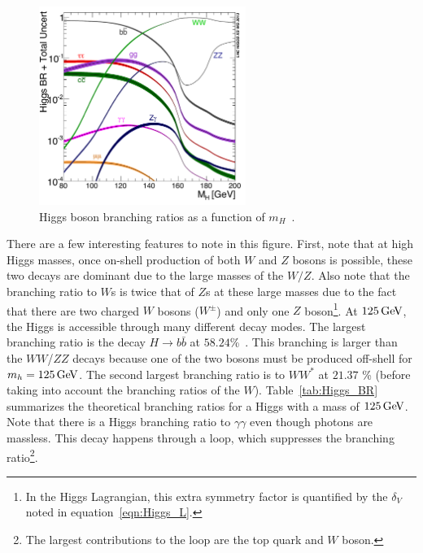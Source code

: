 \begin{figure}[h!]
  \centering
  \captionsetup{justification=centering}
  \includegraphics[width=0.6\textwidth]{figures/Higgs_BR}
  \caption{Higgs boson branching ratios as a function of $m_H$~\cite{LHCXSWG}.}
  \label{fig:branching_ratios}
\end{figure}
%
There are a few interesting features to note in this figure. First, note that at high Higgs masses, once on-shell production of both $W$ and $Z$ bosons is possible, these two decays are dominant due to the large masses of the $W/Z$. Also note that the branching ratio to $W$s is twice that of $Z$s at these large masses due to the fact that there are two charged $W$ bosons ($W^\pm$) and only one $Z$ boson\footnote{In the Higgs Lagrangian, this extra symmetry factor is quantified by the $\delta_V$ noted in equation~\ref{eqn:Higgs_L}.}. At $125 \GeV$, the Higgs is accessible through many different decay modes. The largest branching ratio is the decay $H\to b\bar{b}$ at $58.24$\%~\cite{LHCXSWG}. This branching is larger than the $WW$/$ZZ$ decays because one of the two bosons must be produced off-shell for $m_h = 125 \GeV$. The second largest branching ratio is to $WW^*$ at $21.37$ \% (before taking into account the branching ratios of the $W$). Table~\ref{tab:Higgs_BR} summarizes the theoretical branching ratios for a Higgs with a mass of $125 \GeV$. Note that there is a Higgs branching ratio to $\gamma\gamma$ even though photons are massless. This decay happens through a loop, which suppresses the branching ratio\footnote{The largest contributions to the loop are the top quark and $W$ boson.}. 

